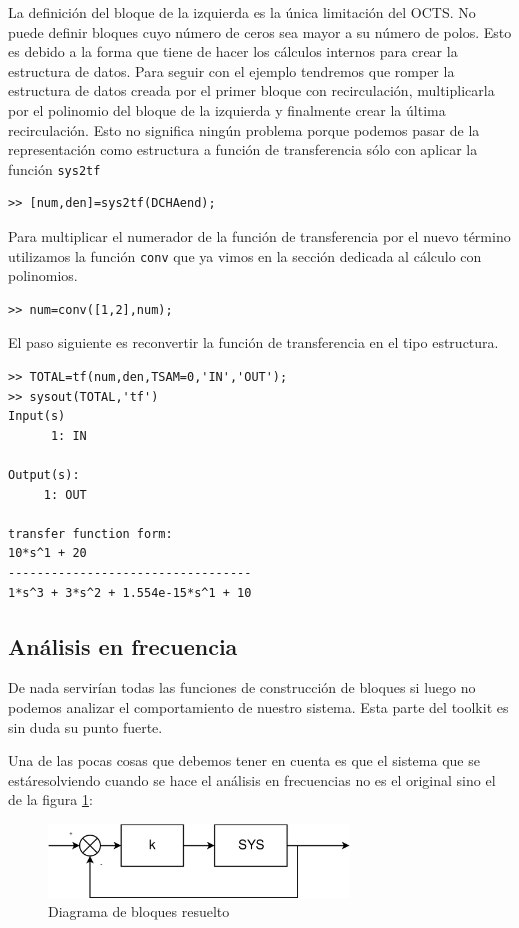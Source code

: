 La definición del bloque de la izquierda es la única limitación del
OCTS. No puede definir bloques cuyo número de ceros sea mayor a su
número de polos. Esto es debido a la forma que tiene de hacer los
cálculos internos para crear la estructura de datos. Para seguir con
el ejemplo tendremos que romper la estructura de datos creada por el
primer bloque con recirculación, multiplicarla por el polinomio del
bloque de la izquierda y finalmente crear la última recirculación.
Esto no significa ningún problema porque podemos pasar de la
representación como estructura a función de transferencia sólo con
aplicar la función \texttt{sys2tf}
\begin{verbatim}
>> [num,den]=sys2tf(DCHAend);
\end{verbatim} 
Para multiplicar el numerador de la función de transferencia por el
nuevo término utilizamos la función \texttt{conv} que ya vimos en la
sección dedicada al cálculo con polinomios.
\begin{verbatim}
>> num=conv([1,2],num);
\end{verbatim} 
El paso siguiente es reconvertir la función de transferencia en el
tipo estructura.
\begin{verbatim}
>> TOTAL=tf(num,den,TSAM=0,'IN','OUT');
>> sysout(TOTAL,'tf')
Input(s)
      1: IN

Output(s):
     1: OUT

transfer function form:
10*s^1 + 20
----------------------------------
1*s^3 + 3*s^2 + 1.554e-15*s^1 + 10
\end{verbatim}


\subsection{Análisis en frecuencia}

\label{sec:analisis}

De nada servirían todas las funciones de construcción de bloques si
luego no podemos analizar el comportamiento de nuestro sistema. Esta
parte del toolkit es sin duda su punto fuerte.

Una de las pocas cosas que debemos tener en cuenta es que el sistema
que se estáresolviendo cuando se hace el análisis en frecuencias no
es el original sino el de la figura \ref{cap:DBloques2}:

%
\begin{figure}

 \centering{} \includegraphics[width=8cm, keepaspectratio]{figuras/sistema2}


\caption{\label{cap:DBloques2}Diagrama de bloques resuelto}
\end{figure}


